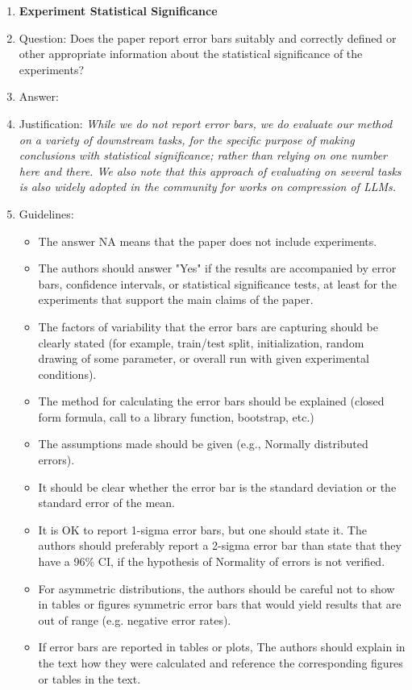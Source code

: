 \documentclass{article}
\theoremstyle{plain}
\begin{document}
\begin{enumerate}
\item {\bf Experiment Statistical Significance}
    \item[] Question: Does the paper report error bars suitably and correctly defined or other appropriate information about the statistical significance of the experiments?
    \item[] Answer: \answerYes %
    \item[] Justification: \textit{While we do not report error bars, we do evaluate our method on a variety of downstream tasks, for the specific purpose of making conclusions with statistical significance; rather than relying on one number here and there. We also note that this approach of evaluating on several tasks is also widely adopted in the community for works on compression of LLMs.}
    \item[] Guidelines:
    \begin{itemize}
        \item The answer NA means that the paper does not include experiments.
        \item The authors should answer "Yes" if the results are accompanied by error bars, confidence intervals, or statistical significance tests, at least for the experiments that support the main claims of the paper.
        \item The factors of variability that the error bars are capturing should be clearly stated (for example, train/test split, initialization, random drawing of some parameter, or overall run with given experimental conditions).
        \item The method for calculating the error bars should be explained (closed form formula, call to a library function, bootstrap, etc.)
        \item The assumptions made should be given (e.g., Normally distributed errors).
        \item It should be clear whether the error bar is the standard deviation or the standard error of the mean.
        \item It is OK to report 1-sigma error bars, but one should state it. The authors should preferably report a 2-sigma error bar than state that they have a 96\% CI, if the hypothesis of Normality of errors is not verified.
        \item For asymmetric distributions, the authors should be careful not to show in tables or figures symmetric error bars that would yield results that are out of range (e.g. negative error rates).
        \item If error bars are reported in tables or plots, The authors should explain in the text how they were calculated and reference the corresponding figures or tables in the text.
    \end{itemize}


\end{enumerate}
\end{document}
